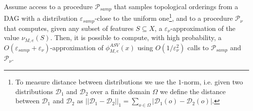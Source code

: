 \newcommand{\procedureSampling}{\mathcal{P}_{samp}}
\newcommand{\procedureNu}{\mathcal{P}_{\nu}}

\begin{proposition}\label{prop:sampling_to_compute_ASV}
	Assume access to a procedure $\procedureSampling$ that samples topological orderings from a DAG with a distribution $\varepsilon_{samp}$-close to the uniform one\footnote{To measure distance between distributions we use the $1$-norm, i.e. given two distributions $\mathcal{D}_1$ and $\mathcal{D}_2$ over a finite domain $\Omega$ we define the distance between $\mathcal{D}_1$ and $\mathcal{D}_2$ as $||\mathcal{D}_1 - \mathcal{D}_2||_1 = \sum_{o \in \Omega} |\mathcal{D}_1(o) - \mathcal{D}_2(o)|$.},
	and to a procedure $\procedureNu$ that computes, given any subset of features $S \subseteq X$, a $\varepsilon_{\nu}$-approximation of the value $\nu_{M,e}(S)$. Then, it is possible to compute, with high probability, a $O(\varepsilon_{samp} + \varepsilon_{\nu})$-approximation of $\phi^{ASV}_{M,e}(x)$ using $O(1/\varepsilon_{\nu}^2)$ calls to $\procedureSampling$ and $\procedureNu$. 
\end{proposition}

\newcommand{\randomVar}{V^{M,e}}

